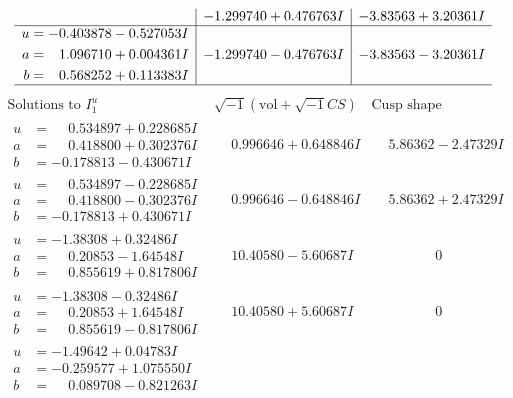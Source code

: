\documentclass[1p]{elsarticle_modified}
\theoremstyle{definition}
\newcommand{\I}{\sqrt{-1}}
\begin{document}
$$\begin{array}{c|c|c}
 & -1.299740 + 0.476763 I & -3.83563 + 3.20361 I \\ \hline\begin{aligned}
u &= -0.403878 - 0.527053 I \\
a &= \phantom{-}1.096710 + 0.004361 I \\
b &= \phantom{-}0.568252 + 0.113383 I\end{aligned}
 & -1.299740 - 0.476763 I & -3.83563 - 3.20361 I\\
 \hline 
 \end{array}$$\newpage$$\begin{array}{c|c|c}  
\text{Solutions to }I^u_{1}& \I (\text{vol} + \sqrt{-1}CS) & \text{Cusp shape}\\
 \hline 
\begin{aligned}
u &= \phantom{-}0.534897 + 0.228685 I \\
a &= \phantom{-}0.418800 + 0.302376 I \\
b &= -0.178813 - 0.430671 I\end{aligned}
 & \phantom{-}0.996646 + 0.648846 I & \phantom{-}5.86362 - 2.47329 I \\ \hline\begin{aligned}
u &= \phantom{-}0.534897 - 0.228685 I \\
a &= \phantom{-}0.418800 - 0.302376 I \\
b &= -0.178813 + 0.430671 I\end{aligned}
 & \phantom{-}0.996646 - 0.648846 I & \phantom{-}5.86362 + 2.47329 I \\ \hline\begin{aligned}
u &= -1.38308 + 0.32486 I \\
a &= \phantom{-}0.20853 - 1.64548 I \\
b &= \phantom{-}0.855619 + 0.817806 I\end{aligned}
 & \phantom{-}10.40580 - 5.60687 I & \phantom{-0.000000 } 0 \\ \hline\begin{aligned}
u &= -1.38308 - 0.32486 I \\
a &= \phantom{-}0.20853 + 1.64548 I \\
b &= \phantom{-}0.855619 - 0.817806 I\end{aligned}
 & \phantom{-}10.40580 + 5.60687 I & \phantom{-0.000000 } 0 \\ \hline\begin{aligned}
u &= -1.49642 + 0.04783 I \\
a &= -0.259577 + 1.075550 I \\
b &= \phantom{-}0.089708 - 0.821263 I\end{aligned}

\end{array}$$
\end{document}
